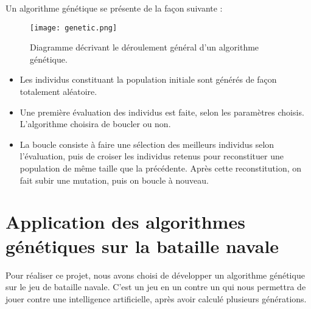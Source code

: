 \documentclass[12pt]{report}
\begin{document}
	\newpage
	Un algorithme génétique se présente de la façon suivante :\\
    \hspace{0pt}
    \begin{figure}[h]
    	\begin{center}
		\texttt{[image: genetic.png]}
		\caption{Diagramme décrivant le déroulement général d'un algorithme génétique.}
		\end{center}
	\end{figure}
	\begin{itemize}
	\itemsep0em 
	\item Les individus constituant la population initiale sont générés de façon totalement aléatoire.\\
	\item Une première évaluation des individus est faite, selon les paramètres choisis. L'algorithme choisira de boucler ou non.\\
	\item La boucle consiste à faire une sélection des meilleurs individus selon l'évaluation, 
	puis de croiser les individus retenus pour reconstituer une population de même taille que la précédente. Après cette reconstitution, on fait subir une mutation, puis on boucle à nouveau.
	\end{itemize}
	
\newpage
{}
\section{Application des algorithmes génétiques sur la bataille navale}
	Pour réaliser ce projet, nous avons choisi de développer un algorithme génétique sur le jeu de bataille navale. C'est un jeu en un contre un qui nous permettra de jouer contre une intelligence artificielle, après avoir calculé plusieurs générations.
\end{document}
